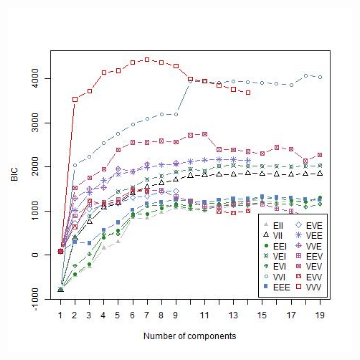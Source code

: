 \documentclass{article}
\begin{document}
\begin{figure}[h!]
\begin{subfigure}[b]{0.4\linewidth}
\end{subfigure} 
\begin{subfigure}[b]{0.4\linewidth}
  \includegraphics[width=\linewidth]{r_bicplot.jpg}
\end{subfigure}
\end{figure} 
\end{document}
